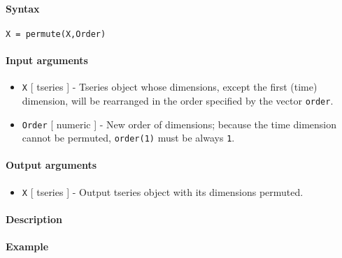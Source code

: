 


	\paragraph{Syntax}\label{syntax}

\begin{verbatim}
X = permute(X,Order)
\end{verbatim}

\paragraph{Input arguments}\label{input-arguments}

\begin{itemize}
\item
  \texttt{X} {[} tseries {]} - Tseries object whose dimensions, except
  the first (time) dimension, will be rearranged in the order specified
  by the vector \texttt{order}.
\item
  \texttt{Order} {[} numeric {]} - New order of dimensions; because the
  time dimension cannot be permuted, \texttt{order(1)} must be always
  \texttt{1}.
\end{itemize}

\paragraph{Output arguments}\label{output-arguments}

\begin{itemize}
\itemsep1pt\parskip0pt
\item
  \texttt{X} {[} tseries {]} - Output tseries object with its dimensions
  permuted.
\end{itemize}

\paragraph{Description}\label{description}

\paragraph{Example}\label{example}


